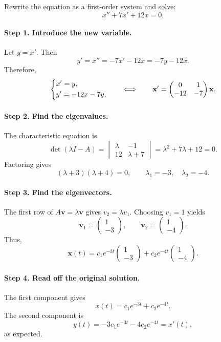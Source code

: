 \documentclass[10pt,letterpaper]{article}
\begin{document}
\begin{example}[1]{
Rewrite the equation as a first-order system and solve:
\[
x''+7x'+12x=0.
\]
}

\paragraph{Step 1. Introduce the new variable.}
Let $y=x'$. Then
\[
y'=x''=-7x'-12x=-7y-12x.
\]
Therefore,
\[
\begin{dcases}
x'=y,\\
y'=-12x-7y,
\end{dcases}
\qquad\Longleftrightarrow\qquad
\mathbf{x}'=
\begin{pmatrix}
0&1\\
-12&-7
\end{pmatrix}\mathbf{x}.
\]

\paragraph{Step 2. Find the eigenvalues.}
The characteristic equation is
\[
\det(\lambda I-A)
=
\begin{vmatrix}
\lambda&-1\\
12&\lambda+7
\end{vmatrix}
=\lambda^2+7\lambda+12=0.
\]
Factoring gives
\[
(\lambda+3)(\lambda+4)=0,
\qquad
\lambda_1=-3,\quad \lambda_2=-4.
\]

\paragraph{Step 3. Find the eigenvectors.}
The first row of $A\mathbf{v}=\lambda\mathbf{v}$ gives
$v_2=\lambda v_1$. Choosing $v_1=1$ yields
\[
\mathbf{v}_1=
\begin{pmatrix}1\\-3\end{pmatrix},
\qquad
\mathbf{v}_2=
\begin{pmatrix}1\\-4\end{pmatrix}.
\]
Thus,
\[
\mathbf{x}(t)
=c_1e^{-3t}\begin{pmatrix}1\\-3\end{pmatrix}
+c_2e^{-4t}\begin{pmatrix}1\\-4\end{pmatrix}.
\]

\paragraph{Step 4. Read off the original solution.}
The first component gives
\[
\boxed{x(t)=c_1e^{-3t}+c_2e^{-4t}.}
\]
The second component is
\[
y(t)=-3c_1e^{-3t}-4c_2e^{-4t}=x'(t),
\]
as expected.
\end{example}
\end{document}
